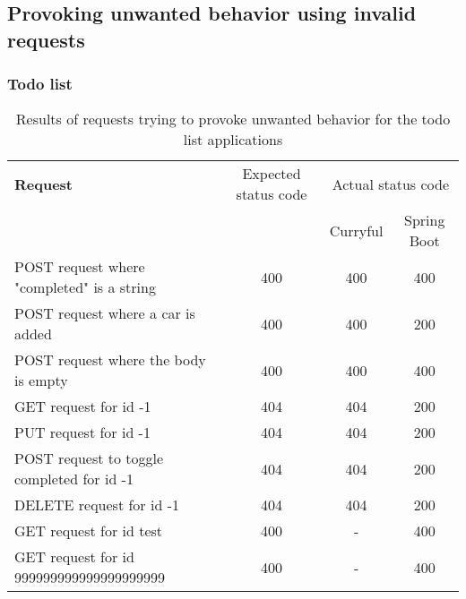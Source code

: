 \documentclass[a4paper,titlepage]{article}
\begin{document}
\subsection{Provoking unwanted behavior using invalid requests}
\subsubsection{Todo list}
\begin{table}[h!]
	\begin{tabularx}{\textwidth}{|X|c|c|c|}
		\hline
		\textbf{Request}                           & Expected status code & \multicolumn{2}{c|}{Actual status code}               \\
		                                           &                      & Curryful                                & Spring Boot \\
		\hline
		POST request where "completed" is a string & 400                  & 400                                     & 400         \\
		POST request where a car is added          & 400                  & 400                                     & 200         \\
		POST request where the body is empty       & 400                  & 400                                     & 400         \\
		GET request for id -1                      & 404                  & 404                                     & 200         \\
		PUT request for id -1                      & 404                  & 404                                     & 200         \\
		POST request to toggle completed for id -1 & 404                  & 404                                     & 200         \\
		DELETE request for id -1                   & 404                  & 404                                     & 200         \\
		GET request for id test                    & 400                  & -                                       & 400         \\
		GET request for id 999999999999999999999   & 400                  & -                                       & 400         \\
		\hline
	\end{tabularx}
	\caption{
		Results of requests trying to provoke unwanted behavior for the todo
		list applications
	}
\end{table}
\end{document}
